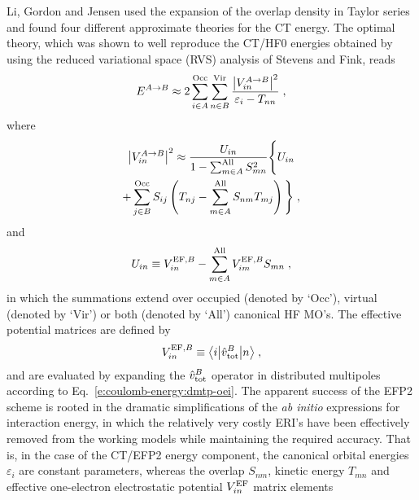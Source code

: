Li, Gordon and Jensen used the expansion of the overlap density 
in Taylor series and found four different approximate
theories for the CT energy.\cite{Li.Gordon.Jensen.JCP.2006} 
The optimal theory, which was shown
to well reproduce the CT/HF0 energies obtained by using 
the reduced variational space (RVS)
analysis of Stevens and Fink\cite{Stevens.Fink.CPL.1987},
reads
%
\begin{equation} \label{e:u-efp2-ct}
 E^{A\rightarrow B} \approx 
 2\sum_{i\in A}^{\rm Occ}
  \sum_{n\in B}^{\rm Vir}
   \frac{ \left| V_{in}^{A\rightarrow B} \right|^2}{\varepsilon_{i} - T_{nn}} \;,
\end{equation}
%
where
%
\begin{multline} \label{e:u-efp2-ct-v2}
 \left| V_{in}^{A\rightarrow B} \right|^2 \approx
 \frac{U_{in}}{1-\sum_{m\in A}^{\rm All} S_{mn}^2}
 \Bigg\{
   U_{in} \\ + \sum_{j\in B}^{\rm Occ} S_{ij} 
   \left( 
     T_{nj} - \sum_{m\in A}^{\rm All} S_{nm} T_{mj}
   \right)
 \Bigg\} \;,
\end{multline}
%
and 
%
\begin{equation} \label{e:uin-efp2}
 U_{in} \equiv V_{in}^{{\rm EF},B} - \sum_{m\in A}^{\rm All} V_{im}^{{\rm EF},B} S_{mn} \;,
\end{equation}
%
in which the summations extend over occupied (denoted by `Occ'), virtual (denoted by `Vir') 
or both (denoted by `All') canonical HF MO's. The effective potential 
matrices are defined by
%
\begin{equation} \label{e:v-efp2-eff}
 V_{in}^{{\rm EF},B} \equiv 
 \bigl\langle {i} \bigl\lvert {\hat{v}^B_{\rm tot} } \bigl\lvert {n} \bigr\rangle \;,
\end{equation}
%
and are evaluated by expanding the $\hat{v}^B_{\rm tot}$ operator
in distributed multipoles according to Eq.~\eqref{e:coulomb-energy:dmtp-oei}.
The apparent success of the EFP2 scheme is rooted in the dramatic simplifications of the
\emph{ab initio} expressions for interaction energy, in which
the relatively very costly ERI's
have been effectively removed from the working models while maintaining the required accuracy. 
That is, in the case of the CT/EFP2 energy component, 
the canonical orbital energies $\varepsilon_i$ are
constant parameters, whereas the overlap $S_{nm}$, kinetic energy $T_{mn}$ and effective
one\hyp{}electron electrostatic potential $V_{in}^{{\rm EF}}$ matrix elements
